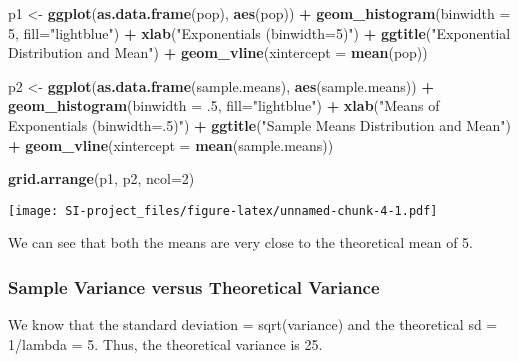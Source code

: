 \documentclass[]{article}
\newenvironment{Shaded}{\begin{snugshade}}{\end{snugshade}}
\newcommand{\KeywordTok}[1]{\textcolor[rgb]{0.13,0.29,0.53}{\textbf{#1}}}
\newcommand{\DataTypeTok}[1]{\textcolor[rgb]{0.13,0.29,0.53}{#1}}
\newcommand{\DecValTok}[1]{\textcolor[rgb]{0.00,0.00,0.81}{#1}}
\newcommand{\StringTok}[1]{\textcolor[rgb]{0.31,0.60,0.02}{#1}}
\newcommand{\OperatorTok}[1]{\textcolor[rgb]{0.81,0.36,0.00}{\textbf{#1}}}
\newcommand{\NormalTok}[1]{#1}
\begin{document}
\begin{Shaded}
\begin{Highlighting}[]
\NormalTok{p1 <-}\StringTok{ }\KeywordTok{ggplot}\NormalTok{(}\KeywordTok{as.data.frame}\NormalTok{(pop), }\KeywordTok{aes}\NormalTok{(pop)) }\OperatorTok{+}\StringTok{ }
\StringTok{  }\KeywordTok{geom_histogram}\NormalTok{(}\DataTypeTok{binwidth =} \DecValTok{5}\NormalTok{, }\DataTypeTok{fill=}\StringTok{"lightblue"}\NormalTok{) }\OperatorTok{+}
\StringTok{  }\KeywordTok{xlab}\NormalTok{(}\StringTok{"Exponentials (binwidth=5)"}\NormalTok{) }\OperatorTok{+}
\StringTok{  }\KeywordTok{ggtitle}\NormalTok{(}\StringTok{"Exponential Distribution and Mean"}\NormalTok{) }\OperatorTok{+}
\StringTok{  }\KeywordTok{geom_vline}\NormalTok{(}\DataTypeTok{xintercept =} \KeywordTok{mean}\NormalTok{(pop))}

\NormalTok{p2 <-}\StringTok{ }\KeywordTok{ggplot}\NormalTok{(}\KeywordTok{as.data.frame}\NormalTok{(sample.means), }\KeywordTok{aes}\NormalTok{(sample.means)) }\OperatorTok{+}\StringTok{ }
\StringTok{  }\KeywordTok{geom_histogram}\NormalTok{(}\DataTypeTok{binwidth =}\NormalTok{ .}\DecValTok{5}\NormalTok{, }\DataTypeTok{fill=}\StringTok{"lightblue"}\NormalTok{) }\OperatorTok{+}
\StringTok{  }\KeywordTok{xlab}\NormalTok{(}\StringTok{"Means of Exponentials (binwidth=.5)"}\NormalTok{) }\OperatorTok{+}
\StringTok{  }\KeywordTok{ggtitle}\NormalTok{(}\StringTok{"Sample Means Distribution and Mean"}\NormalTok{) }\OperatorTok{+}
\StringTok{  }\KeywordTok{geom_vline}\NormalTok{(}\DataTypeTok{xintercept =} \KeywordTok{mean}\NormalTok{(sample.means))}

\KeywordTok{grid.arrange}\NormalTok{(p1, p2, }\DataTypeTok{ncol=}\DecValTok{2}\NormalTok{)}
\end{Highlighting}
\end{Shaded}

\texttt{[image: SI-project\_files/figure-latex/unnamed-chunk-4-1.pdf]}

We can see that both the means are very close to the theoretical mean of
5.

\subsubsection{Sample Variance versus Theoretical
Variance}\label{sample-variance-versus-theoretical-variance}

We know that the standard deviation = sqrt(variance) and the theoretical
sd = 1/lambda = 5. Thus, the theoretical variance is 25.
\end{document}
